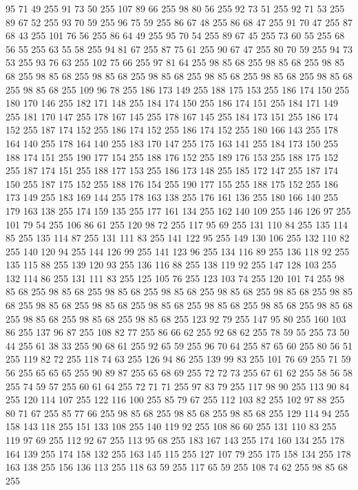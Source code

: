 95 71 49 255 91 73 50 255 107 89 66 255 98 80 56 255 92 73 51 255 92 71 53 255 89 67 52 255 93 70 59 255 96 75 59 255 86 67 48 255 86 68 47 255 91 70 47 255 87 68 43 255 101 76 56 255 86 64 49 255 95 70 54 255 89 67 45 255 73 60 55 255 68 56 55 255 63 55 58 255 94 81 67 255 87 75 61 255 90 67 47 255 80 70 59 255 94 73 53 255 93 76 63 255 102 75 66 255 97 81 64 255 98 85 68 255 98 85 68 255 98 85 68 255 98 85 68 255 98 85 68 255 98 85 68 255 98 85 68 255 98 85 68 255 98 85 68 255 98 85 68 255 109 96 78 255 186 173 149 255 188 175 153 255 186 174 150 255 180 170 146 255 182 171 148 255 184 174 150 255 186 174 151 255 184 171 149 255 181 170 147 255 178 167 145 255 178 167 145 255 184 173 151 255 186 174 152 255 187 174 152 255 186 174 152 255 186 174 152 255 180 166 143 255 178 164 140 255 178 164 140 255 183 170 147 255 175 163 141 255 184 173 150 255 188 174 151 255 190 177 154 255 188 176 152 255
189 176 153 255 188 175 152 255 187 174 151 255 188 177 153 255 186 173 148 255 185 172 147 255 187 174 150 255 187 175 152 255 188 176 154 255 190 177 155 255 188 175 152 255 186 173 149 255 183 169 144 255 178 163 138 255 176 161 136 255 180 166 140 255 179 163 138 255 174 159 135 255 177 161 134 255 162 140 109 255 146 126 97 255 101 79 54 255 106 86 61 255 120 98 72 255 117 95 69 255 131 110 84 255 135 114 85 255 135 114 87 255 131 111 83 255 141 122 95 255 149 130 106 255 132 110 82 255 140 120 94 255 144 126 99 255 141 123 96 255 134 116 89 255 136 118 92 255 135 115 88 255 139 120 93 255 136 116 88 255 138 119 92 255 147 128 103 255 132 114 86 255 131 111 83 255 125 105 76 255 123 103 74 255 120 101 74 255 98 85 68 255 98 85 68 255 98 85 68 255 98 85 68 255 98 85 68 255 98 85 68 255 98 85 68 255 98 85 68 255 98 85 68 255 98 85 68 255 98 85 68 255 98 85 68 255 98 85 68 255 98 85 68 255 98 85 68 255 98 85 68 255 123 92 79 255
147 95 80 255 160 103 86 255 137 96 87 255 108 82 77 255 86 66 62 255 92 68 62 255 78 59 55 255 73 50 44 255 61 38 33 255 90 68 61 255 92 65 59 255 96 70 64 255 87 65 60 255 80 56 51 255 119 82 72 255 118 74 63 255 126 94 86 255 139 99 83 255 101 76 69 255 71 59 56 255 65 65 65 255 90 89 87 255 65 68 69 255 72 72 73 255 67 61 62 255 58 56 58 255 74 59 57 255 60 61 64 255 72 71 71 255 97 83 79 255 117 98 90 255 113 90 84 255 120 114 107 255 122 116 100 255 85 79 67 255 112 103 82 255 102 97 88 255 80 71 67 255 85 77 66 255 98 85 68 255 98 85 68 255 98 85 68 255 129 114 94 255 158 143 118 255 151 133 108 255 140 119 92 255 108 86 60 255 131 110 83 255 119 97 69 255 112 92 67 255 113 95 68 255 183 167 143 255 174 160 134 255 178 164 139 255 174 158 132 255 163 145 115 255 127 107 79 255 175 158 134 255 178 163 138 255 156 136 113 255 118 63 59 255 117 65 59 255 108 74 62 255 98 85 68 255
